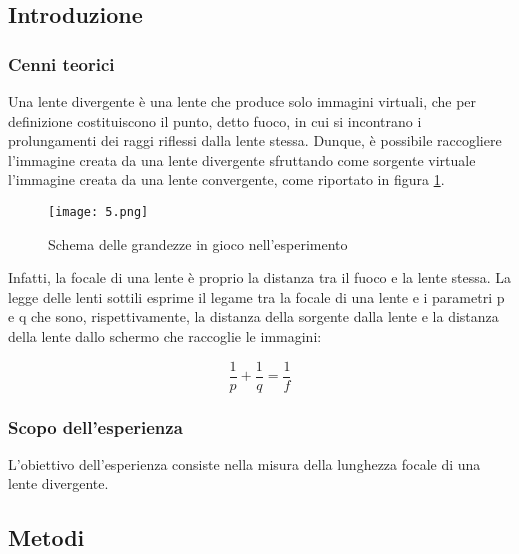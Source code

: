 \documentclass{article}
\begin{document}
\subsection{Introduzione}
\subsubsection{Cenni teorici} %
Una lente divergente è una lente che produce solo immagini virtuali, che per definizione costituiscono il punto, detto fuoco, in cui si incontrano i prolungamenti dei raggi riflessi dalla lente stessa. Dunque, è possibile raccogliere l'immagine creata da una lente divergente sfruttando come sorgente virtuale l'immagine creata da una lente convergente, come riportato in figura \ref{fig:1}.

\begin{figure} [H]
    \centering
    \texttt{[image: 5.png]}
    \caption{Schema delle grandezze in gioco nell'esperimento}
    \label{fig:1}
\end{figure}

Infatti, la focale di una lente è proprio la distanza tra il fuoco e la lente stessa. La legge delle lenti sottili esprime il legame tra la focale di una lente e i parametri p e q che sono, rispettivamente, la distanza della sorgente dalla lente e la distanza della lente dallo schermo che raccoglie le immagini:

\begin{equation}
    \frac{1}{p} + \frac{1}{q} = \frac{1}{f}
\end{equation}

\vspace{1em}

\subsubsection{Scopo dell'esperienza} %
L'obiettivo dell'esperienza consiste nella misura della lunghezza focale di una lente divergente.

\vspace{2em}

\subsection{Metodi}
\end{document}
